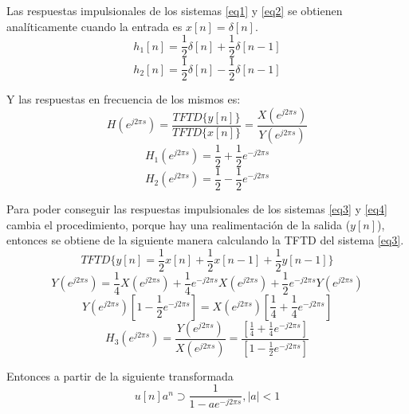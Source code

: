 \documentclass[letterpaper, 10 pt, conference]{ieeeconf}  %
\begin{document}
Las respuestas impulsionales de los sistemas \ref{eq1} y \ref{eq2} se obtienen anal\'iticamente cuando la entrada es $x[n] = \delta[n]$.
\begin{equation} \label{h1}
h_1[n] = \frac{1}{2}\delta[n] + \frac{1}{2}\delta[n-1]
\end{equation}
\begin{equation} \label{h2}
h_2[n] = \frac{1}{2}\delta[n] - \frac{1}{2}\delta[n-1]
\end{equation}

Y las respuestas en frecuencia de los mismos es:
\begin{equation*}
  H(e^{j2{\pi}s}) = \frac{TFTD\{y[n]\}}{TFTD\{x[n]\}} = \frac{X(e^{j2{\pi}s})}{Y(e^{j2{\pi}s})}
\end{equation*}
\begin{equation} \label{H1}
  H_1(e^{j2{\pi}s}) = \frac{1}{2} + \frac{1}{2}e^{-j2{\pi}s}
\end{equation}
\begin{equation} \label{H2}
  H_2(e^{j2{\pi}s}) = \frac{1}{2} - \frac{1}{2}e^{-j2{\pi}s}
\end{equation}

Para poder conseguir las respuestas impulsionales de los sistemas \ref{eq3} y \ref{eq4} cambia el procedimiento, porque hay una realimentaci\'on de la salida ($y[n]$), entonces se obtiene de la siguiente manera calculando la TFTD del sistema \ref{eq3}.
\[ TFTD\{y[n] = \frac{1}{2}x[n] + \frac{1}{2}x[n-1] + \frac{1}{2}y[n-1]\} \]
\begin{equation*}
  Y(e^{j2{\pi}s}) = \frac{1}{4}X(e^{j2{\pi}s}) + \frac{1}{4}e^{-j2{\pi}s}X(e^{j2{\pi}s}) + \frac{1}{2}e^{-j2{\pi}s}Y(e^{j2{\pi}s})
\end{equation*}
\begin{equation*}
  Y(e^{j2{\pi}s}) [ 1 - \frac{1}{2}e^{-j2{\pi}s}] = X(e^{j2{\pi}s}) [ \frac{1}{4} + \frac{1}{4}e^{-j2{\pi}s}]
\end{equation*}
\begin{equation} \label{H3}
  H_3(e^{j2{\pi}s}) = \frac{Y(e^{j2{\pi}s})}{X(e^{j2{\pi}s})} = \frac{[ \frac{1}{4} + \frac{1}{4}e^{-j2{\pi}s}]}{[ 1 - \frac{1}{2}e^{-j2{\pi}s}]}
\end{equation}

Entonces a partir de la siguiente transformada
\begin{equation*}
  u[n]a^n \supset \frac{1}{1-ae^{-j2{\pi}s}} , |a|<1
\end{equation*}
\end{document}

